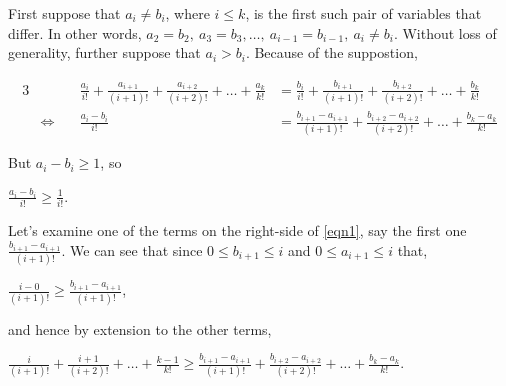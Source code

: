 \documentclass{article}
\begin{document}
\break
First suppose that \(a_i\ne{}b_i\), where \(i \le{} k\), is the first such pair of variables
that differ. In other words,
\(a_2\!=\!b_2,\ a_3\!=\!b_3, \dots{},\ a_{i-1}\!=\!b_{i-1},\ a_i\!\ne{}\!b_i\).
Without loss of generality, further suppose that \(a_i > b_i\).
Because of the suppostion,
% 

{\footnotesize
\bgroup
\setlength{\abovedisplayskip}{0pt}
\setlength{\belowdisplayskip}{0pt}
\begin{alignat}{3}
  &&\frac{a_i}{i!}
  + \frac{a_{i+1}}{(i+1)!}
  + \frac{a_{i+2}}{(i+2)!}
  + \dots{}
  + \frac{a_k}{k!}
  &= \frac{b_i}{i!}
  + \frac{b_{i+1}}{(i+1)!}
  + \frac{b_{i+2}}{(i+2)!}
  + \dots{}
  + \frac{b_k}{k!} \nonumber \\
  &\Leftrightarrow\quad &\frac{a_i - b_i}{i!}
  &= \frac{b_{i+1} - a_{i+1}}{(i+1)!}
  + \frac{b_{i+2} - a_{i+2}}{(i+2)!}
  + \dots{}
  + \frac{b_k - a_k}{k!} \label{eqn1}
\end{alignat}
\egroup
}%

But \(a_i - b_i \ge{} 1\), so

\begin{center}
\(\frac{a_i - b_i}{i!} \ge{} \frac{1}{i!}\).
\end{center}

% 
Let's examine
one of the terms
on the right-side of \eqref{eqn1}, say
the first one \(\frac{b_{i+1} - a_{i+1}}{(i+1)!}\). We can see that since
\(0 \le b_{i+1} \le{} i\) and \(0 \le a_{i+1} \le{} i\) that,

\begin{center}
\(\frac{i - 0}{(i+1)!} \ge{} \frac{b_{i+1} - a_{i+1}}{(i+1)!}\),
\end{center}

and hence by extension to the other terms,

\begin{center}
\(
\frac{i}{(i+1)!}
+ \frac{i+1}{(i+2)!}
+ \dots{} + \frac{k-1}{k!} \ge{}
\frac{b_{i+1} - a_{i+1}}{(i+1)!}
+ \frac{b_{i+2} - a_{i+2}}{(i+2)!}
+ \dots{} + \frac{b_k - a_k}{k!}\).
\end{center}
\end{document}
